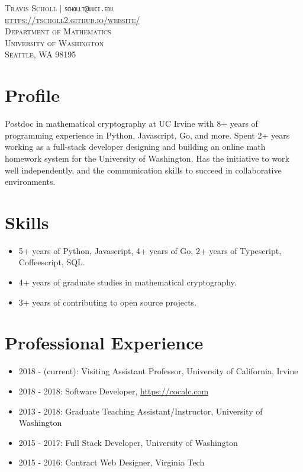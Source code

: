 \documentclass{article}
\begin{document}
	\vspace*{-1.5in}

	\begin{center}
	\textsc{
		Travis Scholl $\vert$ {\tt schollt@uuci.edu} \\ \url{https://tscholl2.github.io/website/} \\
		Department of Mathematics \\
		University of Washington \\
		Seattle, WA 98195
	}
	\end{center}

	\section{Profile}

	Postdoc in mathematical cryptography at UC Irvine with 8+ years of programming experience in Python, Javascript, Go, and more. Spent 2+ years working as a full-stack developer designing and building an online math homework system for the University of Washington. Has the initiative to work well independently, and the communication skills to succeed in collaborative environments.

	\section{Skills}

	\begin{itemize}
		\item 5+ years of Python, Javascript, 4+ years of Go, 2+ years of Typescript, Coffeescript, SQL.
		\item 4+ years of graduate studies in mathematical cryptography.
		\item 3+ years of contributing to open source projects.
	\end{itemize}

	\section{Professional Experience}

	\begin{itemize}
		\item 2018 - (current): Visiting Assistant Professor, University of California, Irvine
		\item 2018 - 2018: Software Developer, \url{https://cocalc.com}
		\item 2013 - 2018: Graduate Teaching Assistant/Instructor, University of Washington
		\item 2015 - 2017: Full Stack Developer, University of Washington
		\item 2015 - 2016: Contract Web Designer, Virginia Tech
	\end{itemize}
\end{document}
